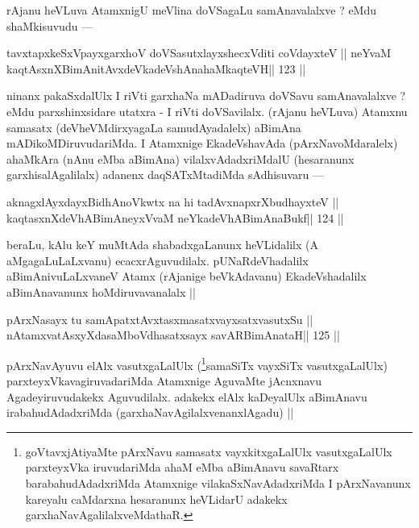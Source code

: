 \begin{artha}
rAjanu heVLuva AtamxnigU meVlina doVSagaLu samAnavalalxve ? eMdu shaMkisuvudu ---
\end{artha} 

\begin{shl}
tavxtapxkeSxV\s payxgarxhoV doVSasutxlayxshecxVditi coVdayxteV ||
neYvaM kaqtAsxnXBimAnitAvxdeVkadeVshAnahaMkaqteVH\hfill || 123 ||
\end{shl}

\begin{artha}
ninanx pakaSxdalUlx I riVti garxhaNa mADadiruva doVSavu samAnavalalxve ? eMdu parxshinxsidare utatxra - I riVti doVSavilalx. (rAjanu heVLuva) Atamxnu samasatx (deVheVMdirxyagaLa samudAyadalelx) aBimAna mADikoMDiruvudariMda. I Atamxnige EkadeVshavAda (pArxNavoMdaralelx) ahaMkAra (nAnu eMba aBimAna) vilalxvAdadxriMdalU (hesaranunx garxhisalAgalilalx) adanenx daqSATxMtadiMda sAdhisuvaru ---
\end{artha} 

\begin{shl}
aknagxlAyxdayxBidhAnoVkwtx na hi tadAvxnapxrXbudhayxteV ||
kaqtasxnXdeVhABimAneyxVvaM neYkadeVhABimAnaBukf\hfill || 124 ||
\end{shl}

\begin{artha}
beraLu, kAlu keY muMtAda shabadxgaLanunx heVLidalilx (A aMgagaLuLaLxvanu) ecacxrAguvudilalx. pUNaRdeVhadalilx aBimAnivuLaLxvaneV Atamx (rAjanige beVkAdavanu) EkadeVshadalilx aBimAnavanunx hoMdiruvavanalalx ||
\end{artha}

\begin{shl}
pArxNasayx tu samApatxtAvxtasxmasatxvayxsatxvasutxSu ||
nA\s\s tamxvatAsxyXdasaMboVdhasatxsayx savARBimAnataH\hfill || 125 ||
\end{shl}

\begin{artha}
pArxNavAyuvu elAlx vasutxgaLalUlx (\footnote[13]{goVtavxjAtiyaMte pArxNavu samasatx vayxkitxgaLalUlx vasutxgaLalUlx parxteyxVka iruvudariMda ahaM eMba aBimAnavu savaRtarx barabahudAdadxriMda Atamxnige vilakaSxNavAdadxriMda I pArxNavanunx kareyalu caMdarxna hesaranunx heVLidarU adakekx garxhaNavAgalilalxveMdathaR.}samaSiTx vayxSiTx vasutxgaLalUlx) parxteyxVkavagiruvadariMda Atamxnige AguvaMte jAcnxnavu Agadeyiruvudakekx Aguvudilalx. adakekx elAlx kaDeyalUlx aBimAnavu irabahudAdadxriMda (garxhaNavAgilalxvenanxlAgadu) ||
\end{artha}

